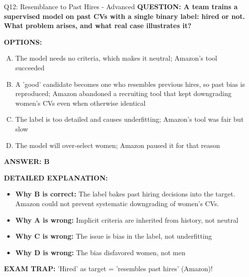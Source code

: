\documentclass[8pt]{beamer}
\begin{document}
\begin{frame}[shrink=6]{Q12: Resemblance to Past Hires - Advanced}
\fontsize{6.5}{7.5}\selectfont
\textbf{QUESTION: A team trains a supervised model on past CVs with a single binary label: hired or not. What problem arises, and what real case illustrates it?}

\vspace{0.1cm}
\textbf{OPTIONS:}
\begin{enumerate}[A.]
\item The model needs no criteria, which makes it neutral; Amazon's tool succeeded
\item A 'good' candidate becomes one who resembles previous hires, so past bias is reproduced; Amazon abandoned a recruiting tool that kept downgrading women's CVs even when otherwise identical
\item The label is too detailed and causes underfitting; Amazon's tool was fair but slow
\item The model will over-select women; Amazon paused it for that reason
\end{enumerate}

\vspace{0.1cm}
\textcolor{myblue}{\textbf{ANSWER: B}}

\vspace{0.1cm}
\textbf{DETAILED EXPLANATION:}
\begin{itemize}
\item \textbf{Why B is correct:} The label bakes past hiring decisions into the target. Amazon could not prevent systematic downgrading of women's CVs.
\item \textbf{Why A is wrong:} Implicit criteria are inherited from history, not neutral
\item \textbf{Why C is wrong:} The issue is bias in the label, not underfitting
\item \textbf{Why D is wrong:} The bias disfavored women, not men
\end{itemize}

\textcolor{myred}{\textbf{EXAM TRAP:}} 'Hired' as target = 'resembles past hires' (Amazon)!
\end{frame}
\end{document}
